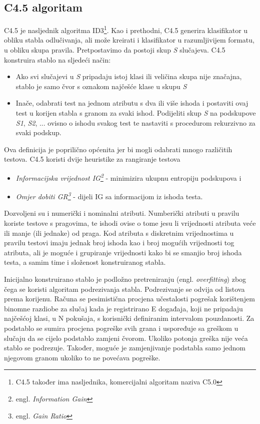 \subsection{C4.5 algoritam}

C4.5 je nasljednik algoritma ID3\footnote{C4.5 također ima nasljednika, komercijalni algoritam naziva C5.0}. Kao i prethodni, C4.5 generira klasifikator u obliku stabla odlučivanja, ali može 
kreirati i klasifikator u razumljivijem formatu, u obliku skupa pravila. Pretpostavimo da postoji skup \textit{S} 
slučajeva. C4.5 konstruira stablo na sljedeći način:
\begin{itemize}
   \item Ako svi slučajevi u \textit{S} pripadaju istoj klasi ili veličina skupa nije značajna, stablo je samo čvor s oznakom najčešće klase u skupu \textit{S}
   \item Inače, odabrati test na jednom atributu s dva ili više ishoda i postaviti ovaj test u korijen stabla s granom za svaki ishod. Podijeliti skup \textit{S} na podskupove \textit{S1}, \textit{S2}, ... ovisno o ishodu svakog test te nastaviti s procedurom rekurzivno za svaki podskup.
\end{itemize}
Ova definicija je poprilično općenita jer bi mogli odabrati mnogo različitih testova. C4.5 koristi dvije heuristike za rangiranje testova
\begin{itemize}
   \item \textit{Informacijska vrijednost IG\footnote{engl. \textit{Information Gain}}}  - minimizira ukupnu entropiju podskupova i
   \item \textit{Omjer dobiti GR\footnote{engl. \textit{Gain Ratio}}} - dijeli IG sa informacijom iz ishoda testa.
\end{itemize}

Dozvoljeni su i numerički i nominalni atributi. Numberički atributi u pravilu koriste testove s pragovima, te ishodi
ovise o tome jesu li vrijednosti atributa veće ili manje (ili jednake) od praga. Kod atributa s diskretnim vrijednostima
u pravilu testovi imaju jednak broj ishoda kao i broj mogućih vrijednosti tog atributa, ali je moguće i grupiranje 
vrijednosti kako bi se smanjio broj ishoda testa, a samim time i složenost konstruiranog stabla.

Inicijalno konstruirano stablo je podložno pretreniranju (engl. \textit{overfitting}) zbog čega se koristi algoritam podrezivanja stabla. Podrezivanje se odvija od listova prema korijenu. Računa se pesimistična procjena učestalosti pogrešak korištenjem binomne razdiobe za slučaj kada je registrirano E događaja, koji ne pripadaju najčešćoj klasi, u N pokušaja, s korisnički definiranim intervalom pouzdanosti. Za podstablo se sumira procjena pogreške svih grana i uspoređuje sa greškom u slučaju da se cijelo podstablo zamjeni čvorom. Ukoliko potonja greška nije veća stablo se podrezuje. Također, moguće je zamjenjivanje podstabla samo jednom njegovom granom ukoliko to ne povećava pogreške\cite{Wu01}.

